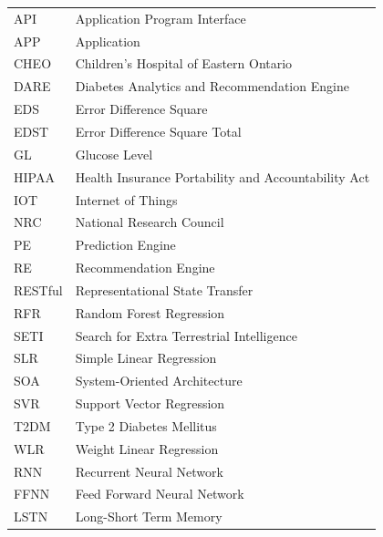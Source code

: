 \prefaceTOC   %
\prefaceLOF   %
\prefaceLOT   %

\begin{tabular}[t]{l@{\hspace*{2cm}}l}
	API & Application Program Interface \\
	APP & Application \\
	CHEO & Children's Hospital of Eastern Ontario \\
	DARE & Diabetes Analytics and Recommendation Engine \\
	EDS & Error Difference Square \\
	EDST & Error Difference Square Total \\
	GL & Glucose Level \\
	HIPAA & Health Insurance Portability and Accountability Act \\
	IOT & Internet of Things \\
	NRC & National Research Council \\
	PE & Prediction Engine \\
	RE & Recommendation Engine \\
	RESTful & Representational State Transfer \\
	RFR & Random Forest Regression \\
	SETI & Search for Extra Terrestrial Intelligence \\
	SLR & Simple Linear Regression \\
	SOA & System-Oriented Architecture \\
	SVR & Support Vector Regression \\
	T2DM & Type 2 Diabetes Mellitus 	\\
	WLR & Weight Linear Regression \\
	RNN & Recurrent Neural Network \\
	FFNN & Feed Forward Neural Network \\
	LSTN & Long-Short Term Memory\\
\end{tabular}

\endpreface
	

